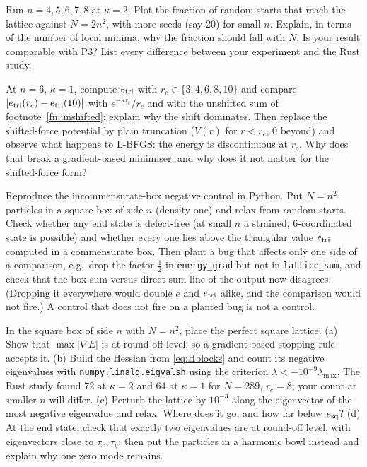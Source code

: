 \begin{exercise}[Varying $N$]
Run $n=4,5,6,7,8$ at $\kappa=2$. Plot the fraction of random starts that reach the lattice against $N=2n^2$, with more
seeds (say 20) for small $n$. Explain, in terms of the number of local minima, why the fraction should fall with $N$.
Is your result comparable with P3? List every difference between your experiment and the Rust study.
\end{exercise}

\begin{exercise}
At $n=6$, $\kappa=1$, compute $e_{\rm tri}$ with $r_c\in\{3,4,6,8,10\}$ and compare $|e_{\rm tri}(r_c)-e_{\rm tri}(10)|$
with $e^{-\kappa r_c}/r_c$ and with the unshifted sum of footnote~\ref{fn:unshifted}; explain why the shift dominates. Then replace the shifted-force potential by plain truncation ($V(r)$ for $r<r_c$, $0$
beyond) and observe what happens to L-BFGS: the energy is discontinuous at $r_c$. Why does that break a gradient-based
minimiser, and why does it not matter for the shifted-force form?
\end{exercise}

\begin{exercise}\label{ex:num-neg}
Reproduce the incommensurate-box negative control in Python. Put $N=n^2$ particles in a square box of side $n$
(density one) and relax from random starts. Check whether any end state is defect-free (at small $n$ a strained,
6-coordinated state is possible) and whether every one lies above the triangular value $e_{\rm tri}$ computed in a
commensurate box. Then plant a bug that affects only one side of a comparison, e.g.\ drop the factor $\frac12$ in
\texttt{energy\_grad} but not in \texttt{lattice\_sum}, and check that the box-sum versus direct-sum line of the output
now disagrees. (Dropping it everywhere would double $e$ and $e_{\rm tri}$ alike, and the comparison would not fire.) A
control that does not fire on a planted bug is not a control.
\end{exercise}

\begin{exercise}\label{ex:num-square}
In the square box of side $n$ with $N=n^2$, place the perfect square lattice. (a) Show that $\max|\nabla E|$ is at
round-off level, so a gradient-based stopping rule accepts it. (b) Build the Hessian from \eqref{eq:Hblocks} and count
its negative eigenvalues with \texttt{numpy.linalg.eigvalsh} using the criterion $\lambda<-10^{-9}\lambda_{\max}$. The
Rust study found 72 at $\kappa=2$ and 64 at $\kappa=1$ for $N=289$, $r_c=8$; your count at smaller $n$ will differ.
(c) Perturb the lattice by $10^{-3}$ along the eigenvector of the most negative eigenvalue and relax. Where does it go,
and how far below $e_{\rm sq}$? (d) At the end state, check that exactly two eigenvalues are at round-off level, with
eigenvectors close to $\tau_x,\tau_y$; then put the particles in a harmonic bowl instead and explain why one zero mode
remains.
\end{exercise}

